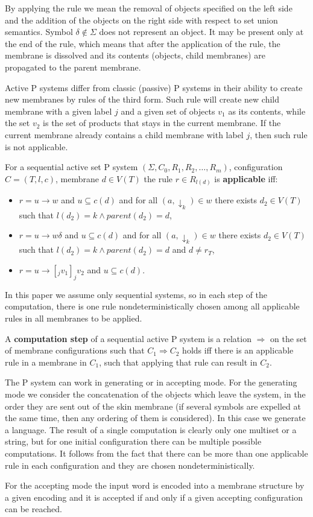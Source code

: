 By applying the rule we mean the removal of objects specified on the left side and the addition of the objects on the right side with respect to set union semantics.
Symbol $\delta\notin\Sigma$ does not represent an object. It may be present only at the end of the rule, which means that after the application of the rule, the membrane is dissolved and its contents (objects, child membranes) are propagated to the parent membrane.

Active P systems differ from classic (passive) P systems in their ability to create new membranes by rules of the third form. Such rule will create new child membrane with a given label $j$ and a given set of objects $v_1$ as its contents, while the set $v_2$ is the set of products that stays in the current membrane. If the current membrane already contains a child membrane with label $j$, then such rule is not applicable.


For a sequential active set P system $(\Sigma, C_0, R_1, R_2, \dots , R_m)$, configuration $C = (T, l, c)$, membrane $d\in V(T)$ the rule $r\in R_{l(d)}$ is {\bf applicable} iff:
\begin{itemize}
  \item $r = u\rightarrow w$ and $u\subseteq c(d)$ and for all $(a,\downarrow_k)\in w$ there exists $d_2\in V(T)$ such that $l(d_2)=k \wedge parent(d_2) = d$,
  \item $r = u\rightarrow w\delta$ and $u\subseteq c(d)$ and for all $(a,\downarrow_k)\in w$ there exists $d_2\in V(T)$ such that $l(d_2)=k \wedge parent(d_2) = d$ and $d\neq r_T$,
  \item $r = u\rightarrow [_j v_1]_j v_2$ and $u\subseteq c(d)$.
\end{itemize}

In this paper we assume only sequential systems, so in each step of the computation, there is one rule nondeterministically chosen among all applicable rules in all membranes to be applied.


A {\bf computation step} of a sequential active P system is a relation $\Rightarrow$ on the set of membrane configurations such that $C_1 \Rightarrow C_2$ holds iff there is an applicable rule in a membrane in $C_1$, such that applying that rule can result in $C_2$.


The P system can work in generating or in accepting mode. For the generating mode we consider the concatenation of the objects which leave the system, in the order they are sent out of the skin membrane (if several symbols are expelled at the same time, then any ordering of them is considered). In this case we generate a language. The result of a single computation is clearly only one multiset or a string, but for one initial configuration there can be multiple possible computations. It follows from the fact that there can be more than one applicable rule in each configuration and they are chosen nondeterministically.

For the accepting mode the input word is encoded into a membrane structure by a given encoding and it is accepted if and only if a given accepting configuration can be reached\cite{Ibarra05Active}.
